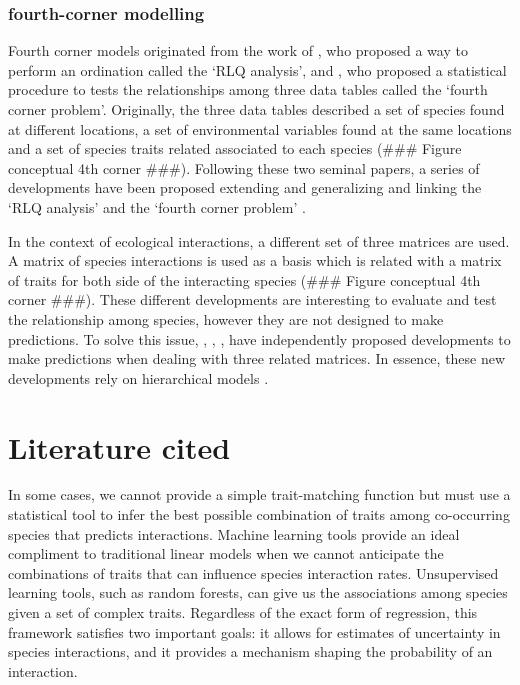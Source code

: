 \subsubsection*{fourth-corner modelling}
\label{fourth-corner modelling}

Fourth corner models originated from the work of \cite{doledec_matching_1996},
who proposed a way to perform an ordination called the `RLQ analysis', and
\cite{legendre_relating_1997}, who proposed a statistical  procedure to tests
the relationships among three data tables called the `fourth corner problem'.
Originally, the three data tables described a set of species found at different
locations, a set of environmental variables found at the same locations and a
set of species traits related associated to each species (\#\#\# Figure
conceptual 4th corner \#\#\#). Following these two seminal papers, a series of
developments have been proposed extending and generalizing and linking the `RLQ
analysis' and the `fourth corner problem' \cite{dray_testing_2008,
dray_combining_2014}.

In the context of ecological interactions, a different set of three matrices are
used. A matrix of species interactions is used as a basis which is related with
a matrix of traits for both side of the interacting species (\#\#\# Figure
conceptual 4th corner \#\#\#). These different developments are interesting to
evaluate and test the relationship among species, however they are not designed
to make predictions. To solve this issue, \cite{nygaard_new_2004},
\cite{pollock_role_2012}, \cite{jamil_selecting_2013},
\cite{brown_fourth-corner_2014} have independently proposed developments to make
predictions when dealing with three related matrices. In essence, these new
developments rely on hierarchical models \cite{gelman_data_2007}.

\section*{Literature cited}\label{literature-cited}









In some cases, we cannot provide a simple trait-matching function but must use a
statistical tool to infer the best possible combination of traits among
co-occurring species that predicts interactions. Machine learning tools provide
an ideal compliment to traditional linear models when we cannot anticipate the
combinations of traits that can influence species interaction rates.
Unsupervised learning tools, such as random forests, can give us the
associations among species given a set of complex traits. Regardless of the
exact form of regression, this framework satisfies two important goals: it
allows for estimates of uncertainty in species interactions, and it provides a
mechanism shaping the probability of an interaction.

